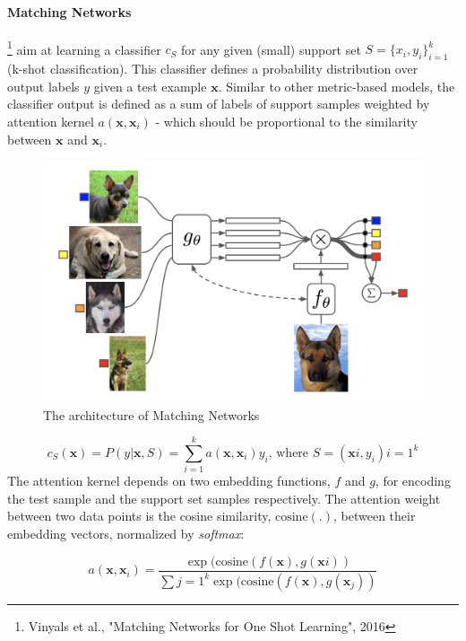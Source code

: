 \documentclass[main]{subfiles}
\begin{document}
\paragraph{Matching Networks}\footnote{Vinyals et al., "Matching Networks for One Shot Learning", 2016} aim at learning a classifier $c_S$ for any given (small) support set $S=\{x_i, y_i\}_{i=1}^k$ (k-shot classification). This classifier defines a probability distribution over output labels $y$ given a test example $\mathbf{x}$. Similar to other metric-based models, the classifier output is defined as a sum of labels of support samples weighted by attention kernel $a(\mathbf{x}, \mathbf{x}_i)$ - which should be proportional to the similarity between $\mathbf{x}$ and $\mathbf{x}_i$.
%
\begin{figure}[H]
    \centering
    \includegraphics[width=0.80\linewidth]{14_ContinualMetaAndTransferLearning/figures/matching_networks.png}
    \caption{The architecture of Matching Networks}
    \label{fig:my_label}
\end{figure}
%
\begin{equation}
    c_S(\mathbf{x}) = P(y \vert \mathbf{x}, S) = \sum_{i=1}^k a(\mathbf{x}, \mathbf{x}_i) y_i \text{, where }S={(\mathbf{x}i, y_i)}{i=1}^k
\end{equation}
The attention kernel depends on two embedding functions, $f$ and $g$, for encoding the test sample and the support set samples respectively. The attention weight between two data points is the cosine similarity, $\text{cosine}(.)$, between their embedding vectors, normalized by \textit{softmax}:

\begin{equation}
    a(\mathbf{x}, \mathbf{x}_i) = \frac{\exp(\text{cosine}(f(\mathbf{x}), g(\mathbf{x}i))}{\sum{j=1}^k\exp(\text{cosine}(f(\mathbf{x}), g(\mathbf{x}_j))}
\end{equation}
\end{document}
